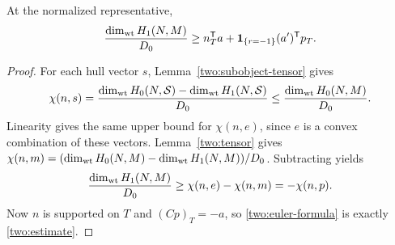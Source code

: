 \begin{lemma}
\label{two:euler}
At the normalized representative,
\begin{equation}
 \frac{\dim_{\mathrm{wt}}H_1(N,M)}{D_0}
 \ge n_T^{\mathsf T}a+
                \mathbf1_{\{r=-1\}}(a')^{\mathsf T}p_T.
 \label{two:estimate}
\end{equation}
\end{lemma}
\begin{proof}
For each hull vector $s$, Lemma~\ref{two:subobject-tensor} gives
\[
 \chi(n,s)=\frac{\dim_{\mathrm{wt}}H_0(N,\mathcal S)
                     -\dim_{\mathrm{wt}}H_1(N,\mathcal S)}{D_0}
       \le\frac{\dim_{\mathrm{wt}}H_0(N,M)}{D_0}.
\]
Linearity gives the same upper bound for $\chi(n,e)$, since $e$
is a convex combination of these vectors.  Lemma~\ref{two:tensor}
gives
$\chi(n,m)=(\dim_{\mathrm{wt}}H_0(N,M)-\dim_{\mathrm{wt}}H_1(N,M))/D_0$.
Subtracting yields
\[
 \frac{\dim_{\mathrm{wt}}H_1(N,M)}{D_0}
       \ge\chi(n,e)-\chi(n,m)=-\chi(n,p).
\]
Now $n$ is supported on $T$ and $(Cp)_T=-a$, so
\eqref{two:euler-formula} is exactly \eqref{two:estimate}.
\end{proof}


